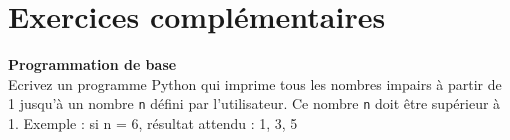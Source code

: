 	
	\newpage
	

\section{Exercices complémentaires}

\begin{Exercice}[10 minutes] \textbf{Programmation de base}\\
	Ecrivez un programme Python qui imprime tous les nombres impairs à partir de 1 jusqu’à un nombre \lstinline{n} défini par l’utilisateur. Ce nombre \lstinline{n} doit être supérieur à 1.
	Exemple : si n = 6, résultat attendu : 1, 3, 5
	\begin{solution}
   		 
	\end{solution}
\end{Exercice}






